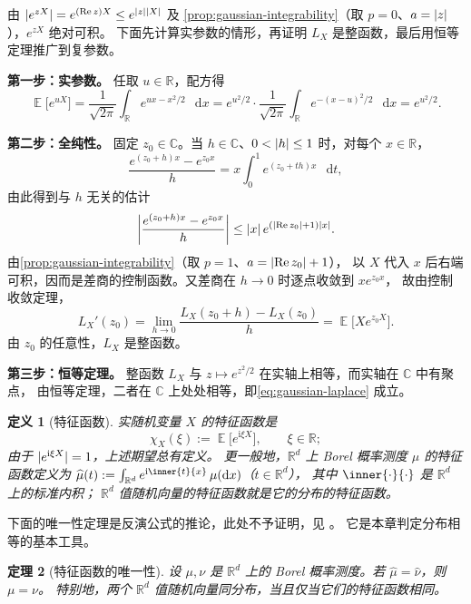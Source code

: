 \documentclass[UTF8,11pt,a4paper,oneside,fontset=fandol]{ctexrep}
\makeatletter
\numberwithin{equation}{section}
\theoremstyle{zhthm}
\newtheorem{theorem}{定理}[section]
\newtheorem{definition}[theorem]{定义}
\renewenvironment{proof}[1][\proofname]{\par
  \pushQED{\qed}%
  \normalfont\topsep6\p@\@plus6\p@\relax
  \trivlist
  \item[\hskip\labelsep\bfseries#1\hspace{0.5em}]\ignorespaces
}{%
  \popQED\endtrivlist\@endpefalse
}
\renewcommand{\proofname}{证明}
\newcommand{\R}{\mathbb{R}}
\newcommand{\C}{\mathbb{C}}
\DeclareMathOperator{\E}{\mathbb{E}}
\newcommand{\iu}{\mathrm{i}}
\newcommand{\dd}{\mathop{}\!\mathrm{d}}
\DeclarePairedDelimiter{\abs}{\lvert}{\rvert}
\makeatother
\begin{document}
\begin{proof}
由 $\abs{e^{zX}}=e^{(\operatorname{Re}z)X}\le e^{\abs{z}\abs{X}}$ 及%
\cref{prop:gaussian-integrability}（取 $p=0$、$a=\abs{z}$），$e^{zX}$ 绝对可积。
下面先计算实参数的情形，再证明 $L_X$ 是整函数，最后用恒等定理推广到复参数。

\textbf{第一步：实参数。}
任取 $u\in\R$，配方得
\[
  \E\bigl[e^{uX}\bigr]
  =\frac{1}{\sqrt{2\pi}}\int_{\R}e^{ux-x^2/2}\,\dd x
  =e^{u^2/2}\cdot\frac{1}{\sqrt{2\pi}}\int_{\R}e^{-(x-u)^2/2}\,\dd x
  =e^{u^2/2}.
\]

\textbf{第二步：全纯性。}
固定 $z_0\in\C$。当 $h\in\C$、$0<\abs{h}\le1$ 时，对每个 $x\in\R$，
\[
  \frac{e^{(z_0+h)x}-e^{z_0x}}{h}=x\int_0^1e^{(z_0+th)x}\,\dd t,
\]
由此得到与 $h$ 无关的估计
\[
  \abs*{\frac{e^{(z_0+h)x}-e^{z_0x}}{h}}
  \le\abs{x}\,e^{(\abs{\operatorname{Re}z_0}+1)\abs{x}}.
\]
由\cref{prop:gaussian-integrability}（取 $p=1$、$a=\abs{\operatorname{Re}z_0}+1$），
以 $X$ 代入 $x$ 后右端可积，因而是差商的控制函数。又差商在 $h\to0$ 时逐点收敛到 $xe^{z_0x}$，
故由控制收敛定理，
\[
  L_X'(z_0)=\lim_{h\to0}\frac{L_X(z_0+h)-L_X(z_0)}{h}=\E\bigl[Xe^{z_0X}\bigr].
\]
由 $z_0$ 的任意性，$L_X$ 是整函数。

\textbf{第三步：恒等定理。}
整函数 $L_X$ 与 $z\mapsto e^{z^2/2}$ 在实轴上相等，而实轴在 $\C$ 中有聚点，
由恒等定理，二者在 $\C$ 上处处相等，即\cref{eq:gaussian-laplace} 成立。
\end{proof}

\begin{definition}[特征函数]
\label{def:characteristic-function}
实随机变量 $X$ 的特征函数是
\[
  \chi_X(\xi):=\E\bigl[e^{\iu\xi X}\bigr],\qquad \xi\in\R;
\]
由于 $\abs{e^{\iu\xi X}}=1$，上述期望总有定义。
更一般地，$\R^d$ 上 Borel 概率测度 $\mu$ 的特征函数定义为
$\widehat\mu(t):=\int_{\R^d}e^{\iu\inner{t}{x}}\,\mu(\dd x)$（$t\in\R^d$），
其中 $\inner{\cdot}{\cdot}$ 是 $\R^d$ 上的标准内积；
$\R^d$ 值随机向量的特征函数就是它的分布的特征函数。
\end{definition}

下面的唯一性定理是反演公式的推论，此处不予证明，见%
\cite[定理 3.3.11（$d=1$，第 128 页）与定理 3.10.4（一般的 $d$，第 199--200 页）]{Durrett2019}。
它是本章判定分布相等的基本工具。

\begin{theorem}[特征函数的唯一性]
\label{thm:characteristic-uniqueness}
设 $\mu,\nu$ 是 $\R^d$ 上的 Borel 概率测度。若 $\widehat\mu=\widehat\nu$，则 $\mu=\nu$。
特别地，两个 $\R^d$ 值随机向量同分布，当且仅当它们的特征函数相同。
\end{theorem}
\end{document}
